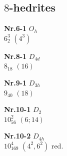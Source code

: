 \documentclass[12pt]{article}
\begin{document}
\subsection{$8$-hedrites}\label{subsection-8-hedrites}
{\small
\setlength{\unitlength}{1cm}
\begin{minipage}[t]{3.5cm}
\centering
\epsfxsize=2.5cm
\par
{{\bf Nr.6-1} \quad $O_h$\\ $6^3_2$ \quad $(4^3)$\\\vspace{3mm} }
\end{minipage}
\setlength{\unitlength}{1cm}
\begin{minipage}[t]{3.5cm}
\centering
\epsfxsize=2.5cm
\par
{{\bf Nr.8-1} \quad $D_{4d}$\\ $8_{18}$ \quad $(16)$\\\vspace{3mm} }
\end{minipage}
\setlength{\unitlength}{1cm}
\begin{minipage}[t]{3.5cm}
\centering
\epsfxsize=2.5cm
\par
{{\bf Nr.9-1} \quad $D_{3h}$\\ $9_{40}$ \quad $(18)$\\\vspace{3mm} }
\end{minipage}
\setlength{\unitlength}{1cm}
\begin{minipage}[t]{3.5cm}
\centering
\epsfxsize=2.5cm
\par
{{\bf Nr.10-1} \quad $D_{2}$\\ $10^2_{56}$ \quad $(6;14)$\\\vspace{3mm} }
\end{minipage}
\setlength{\unitlength}{1cm}
\begin{minipage}[t]{3.5cm}
\centering
\epsfxsize=2.5cm
\par
{{\bf Nr.10-2} \quad $D_{4h}$\\ $10^4_{169}$ \quad $(4^2,6^2)$ red.\\\vspace{3mm} }
\end{minipage}
\setlength{\unitlength}{1cm}
\begin{minipage}[t]{3.5cm}
\centering
\epsfxsize=2.5cm
\par

\end{minipage}}
\end{document}
